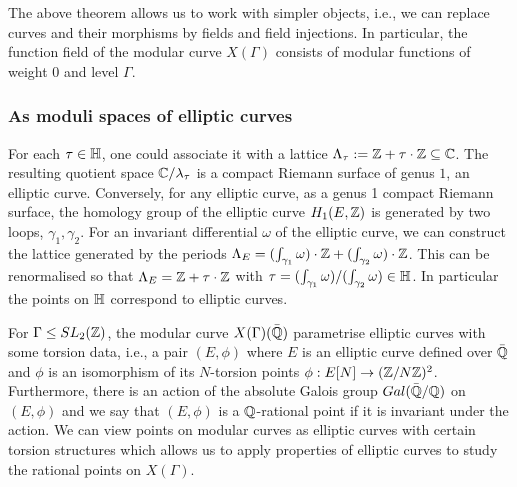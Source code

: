 The above theorem allows us to work with simpler objects, i.e., we can replace curves and their morphisms by fields and field injections. In particular, the function field of the modular curve $X(\Gamma)$ consists of modular functions of weight $0$ and level $\Gamma$. 

\subsubsection{As moduli spaces of elliptic curves}

For each $\tau \in \mathbb{H}$, one could associate it with a lattice $\Lambda_\tau := \mathbb{Z} + \tau \cdot \mathbb{Z} \subseteq \mathbb{C}$. The resulting quotient space $\mathbb{C}/\lambda_\tau$ is a compact Riemann surface of genus $1$, an elliptic curve. Conversely, for any elliptic curve, as a genus 1 compact Riemann surface, the homology group of the elliptic curve $H_1(E,\mathbb{Z})$ is generated by two loops, $\gamma_1, \gamma_2$. For an invariant differential $\omega$ of the elliptic curve, we can construct the lattice generated by the periods $\Lambda_E = (\int_{\gamma_1} \omega) \cdot \mathbb{Z} + (\int_{\gamma_2} \omega) \cdot \mathbb{Z}$. This can be renormalised so that $\Lambda_E = \mathbb{Z} + \tau \cdot \mathbb{Z}$ with $\tau = (\int_{\gamma_1} \omega) /(\int_{\gamma_2} \omega) \in \mathbb{H}$. In particular the points on $\mathbb{H}$ correspond to elliptic curves.

For $\Gamma \leq SL_2(\mathbb{Z})$, the modular curve $X(\Gamma)(\bar{\mathbb{Q}})$ parametrise elliptic curves with some torsion data, i.e., a pair $(E, \phi)$ where $E$ is an elliptic curve defined over $\bar{\mathbb{Q}}$ and $\phi$ is an isomorphism of its $N$-torsion points $\phi: E[N] \rightarrow (\mathbb{Z}/N\mathbb{Z})^2$. Furthermore, there is an action of the absolute Galois group $Gal(\bar{\mathbb{Q}}/\mathbb{Q})$ on $(E,\phi)$ and we say that $(E,\phi)$ is a $\mathbb{Q}$-rational point if it is invariant under the action. We can view points on modular curves as elliptic curves with certain torsion structures which allows us to apply properties of elliptic curves to study the rational points on $X(\Gamma)$.

